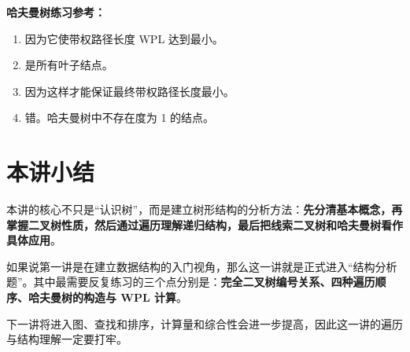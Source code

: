 \documentclass{../../note}
\begin{document}
\textbf{哈夫曼树练习参考：}

\begin{enumerate}
  \item 因为它使带权路径长度 WPL 达到最小。
  \item 是所有叶子结点。
  \item 因为这样才能保证最终带权路径长度最小。
  \item 错。哈夫曼树中不存在度为 1 的结点。
\end{enumerate}

\section{本讲小结}

本讲的核心不只是“认识树”，而是建立树形结构的分析方法：\textbf{先分清基本概念，再掌握二叉树性质，然后通过遍历理解递归结构，最后把线索二叉树和哈夫曼树看作具体应用}。

如果说第一讲是在建立数据结构的入门视角，那么这一讲就是正式进入“结构分析题”。其中最需要反复练习的三个点分别是：\textbf{完全二叉树编号关系、四种遍历顺序、哈夫曼树的构造与 WPL 计算}。

下一讲将进入图、查找和排序，计算量和综合性会进一步提高，因此这一讲的遍历与结构理解一定要打牢。
\end{document}

